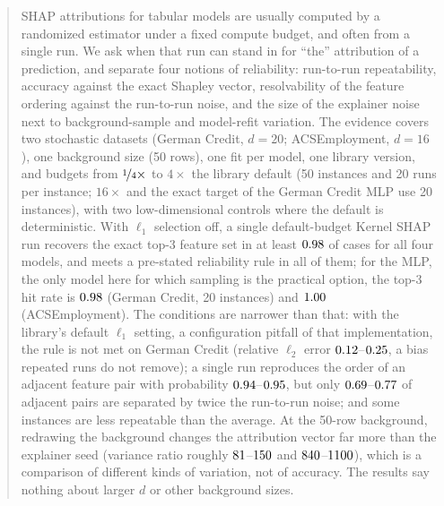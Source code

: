 \begin{abstract}
SHAP attributions for tabular models are usually computed by a randomized estimator under a fixed compute budget, and often from a single run. We ask when that run can stand in for ``the'' attribution of a prediction, and separate four notions of reliability: run-to-run repeatability, accuracy against the exact Shapley vector, resolvability of the feature ordering against the run-to-run noise, and the size of the explainer noise next to background-sample and model-refit variation. The evidence covers two stochastic datasets (German Credit, $d{=}20$; ACSEmployment, $d{=}16$), one background size (50 rows), one fit per model, one library version, and budgets from $\nicefrac14\times$ to $4\times$ the library default (50 instances and 20 runs per instance; $16\times$ and the exact target of the German Credit MLP use 20 instances), with two low-dimensional controls where the default is deterministic. With $\ell_1$ selection off, a single default-budget Kernel SHAP run recovers the exact top-3 feature set in at least $\nGerOneTopHitEstMinR$ of cases for all four models, and meets a pre-stated reliability rule in all of them; for the MLP, the only model here for which sampling is the practical option, the top-3 hit rate is $\nGerMlpOneTopHitEstR$ (German Credit, 20 instances) and $\nAcsMlpOneTopHitEstR$ (ACSEmployment). The conditions are narrower than that: with the library's default $\ell_1$ setting, a configuration pitfall of that implementation, the rule is not met on German Credit (relative $\ell_2$ error $\nGerLoneRelErrEstMinR$--$\nGerLoneRelErrEstMaxR$, a bias repeated runs do not remove); a single run reproduces the order of an adjacent feature pair with probability $\nGerPOrderMinR$--$\nGerPOrderMaxR$, but only $\nGerPairsResMinR$--$\nGerPairsResMaxR$ of adjacent pairs are separated by twice the run-to-run noise; and some instances are less repeatable than the average. At the 50-row background, redrawing the background changes the attribution vector far more than the explainer seed (variance ratio roughly $\nGerBgRatioMinR$--$\nGerBgRatioMaxR$ and $\nAcsBgRatioMinR$--$\nAcsBgRatioMaxR$), which is a comparison of different kinds of variation, not of accuracy. The results say nothing about larger $d$ or other background sizes.
\end{abstract}
